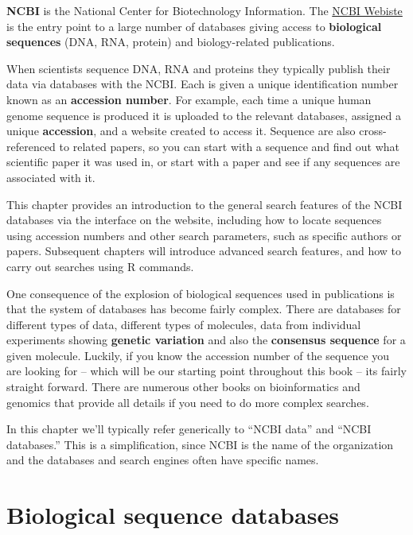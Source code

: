 \documentclass[
]{book}
\begin{document}
\textbf{NCBI} is the National Center for Biotechnology Information. The \href{www.ncbi.nlm.nih.gov/}{NCBI Webiste} is the entry point to a large number of databases giving access to \textbf{biological sequences} (DNA, RNA, protein) and biology-related publications.

When scientists sequence DNA, RNA and proteins they typically publish their data via databases with the NCBI. Each is given a unique identification number known as an \textbf{accession number}. For example, each time a unique human genome sequence is produced it is uploaded to the relevant databases, assigned a unique \textbf{accession}, and a website created to access it. Sequence are also cross-referenced to related papers, so you can start with a sequence and find out what scientific paper it was used in, or start with a paper and see if any sequences are associated with it.

This chapter provides an introduction to the general search features of the NCBI databases via the interface on the website, including how to locate sequences using accession numbers and other search parameters, such as specific authors or papers. Subsequent chapters will introduce advanced search features, and how to carry out searches using R commands.

One consequence of the explosion of biological sequences used in publications is that the system of databases has become fairly complex. There are databases for different types of data, different types of molecules, data from individual experiments showing \textbf{genetic variation} and also the \textbf{consensus sequence} for a given molecule. Luckily, if you know the accession number of the sequence you are looking for -- which will be our starting point throughout this book -- its fairly straight forward. There are numerous other books on bioinformatics and genomics that provide all details if you need to do more complex searches.

In this chapter we'll typically refer generically to ``NCBI data'' and ``NCBI databases.'' This is a simplification, since NCBI is the name of the organization and the databases and search engines often have specific names.

\hypertarget{biological-sequence-databases}{%
\section{Biological sequence databases}\label{biological-sequence-databases}}
\end{document}

